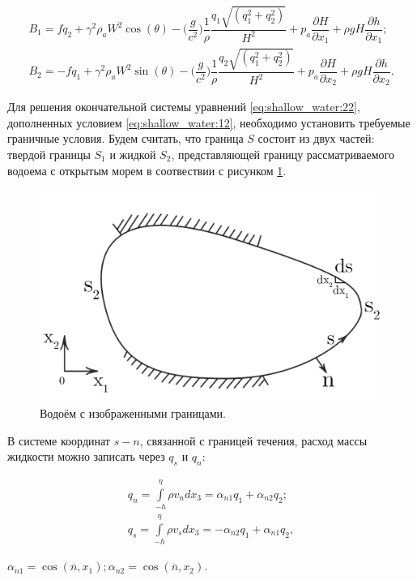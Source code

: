 \documentclass[14pt]{extreport}
\begin{document}

\begin{equation*}
\begin{aligned}
B_1=fq_2+\gamma^2\rho_aW^2\cos(\theta)-\bigg(\dfrac{g}{c^2}\bigg)\dfrac{1}{\rho}\dfrac{q_1\sqrt{(q_1^2+q_2^2)}}{H^2} + p_a \dfrac{\partial H}{\partial x_1} + \rho gH\dfrac{\partial h}{\partial x_1}; \\
B_2=-fq_1+\gamma^2\rho_aW^2\sin(\theta)-\bigg(\dfrac{g}{c^2}\bigg)\dfrac{1}{\rho}\dfrac{q_2\sqrt{(q_1^2+q_2^2)}}{H^2} + p_a \dfrac{\partial H}{\partial x_2} + \rho gH\dfrac{\partial h}{\partial x_2}.
\end{aligned}
\end{equation*}

Для решения окончательной системы уравнений \ref{eq:shallow_water:22}, дополненных условием \ref{eq:shallow_water:12}, необходимо установить требуемые граничные условия. Будем считать, что граница $S$ состоит из двух частей: твердой границы $S_1$ и жидкой $S_2$, представляющей границу рассматриваемого водоема с открытым морем в соотвествии с рисунком \ref{img:shallow_water:3}.

\begin{figure}[H]
\centerline{\includegraphics[width=0.5\linewidth]{images/shallow_water_3}}
\caption{Водоём с изображенными границами.}
\label{img:shallow_water:3}
\end{figure}

В системе координат $s-n$, связанной с границей течения, расход массы жидкости можно записать через $q_s$ и $q_n$:

\begin{equation}\label{eq:shallow_water:24}
\begin{aligned}
q_n=\int\limits^\eta_{-h} \rho v_n dx_3= \alpha_{n1}q_1+\alpha_{n2}q_2; \\
q_s=\int\limits^\eta_{-h} \rho v_s dx_3= -\alpha_{n2}q_1+\alpha_{n1}q_2,
\end{aligned}
\end{equation}

 $\alpha_{n1}=\cos(\overline{n},x_1); \alpha_{n2}=\cos(\overline{n},x_2).$
\end{document}
